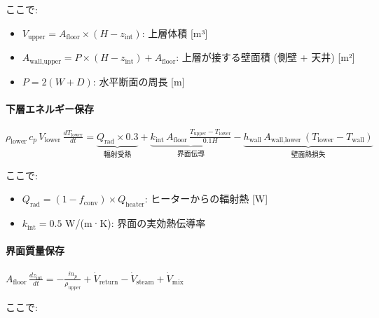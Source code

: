 \documentclass[a4paper,11pt]{article}
\begin{document}
ここで:

\begin{itemize} \item $V_{\text{upper}} = A_{\text{floor}} \times (H - z_{\text{int}})$: 上層体積 [m³] \end{itemize}
\begin{itemize} \item $A_{\text{wall,upper}} = P \times (H - z_{\text{int}}) + A_{\text{floor}}$: 上層が接する壁面積 (側壁 + 天井) [m²] \end{itemize}
\begin{itemize} \item $P = 2(W + D)$: 水平断面の周長 [m] \end{itemize}

\paragraph{下層エネルギー保存}

$
\rho_{\text{lower}} \, c_p \, V_{\text{lower}} \, \frac{dT_{\text{lower}}}{dt}
= \underbrace{Q_{\text{rad}} \times 0.3}_{\text{輻射受熱}}
+ \underbrace{k_{\text{int}} \, A_{\text{floor}} \, \frac{T_{\text{upper}} - T_{\text{lower}}}{0.1 H}}_{\text{界面伝導}}
- \underbrace{h_{\text{wall}} \, A_{\text{wall,lower}} \, (T_{\text{lower}} - T_{\text{wall}})}_{\text{壁面熱損失}}
$

ここで:

\begin{itemize} \item $Q_{\text{rad}} = (1 - f_{\text{conv}}) \times Q_{\text{heater}}$: ヒーターからの輻射熱 [W] \end{itemize}
\begin{itemize} \item $k_{\text{int}} = 0.5$ W/(m·K): 界面の実効熱伝導率 \end{itemize}

\paragraph{界面質量保存}

$
A_{\text{floor}} \, \frac{dz_{\text{int}}}{dt}
= -\frac{\dot{m}_p}{\rho_{\text{upper}}} + \dot{V}_{\text{return}} - \dot{V}_{\text{steam}} + \dot{V}_{\text{mix}}
$

ここで:
\end{document}
